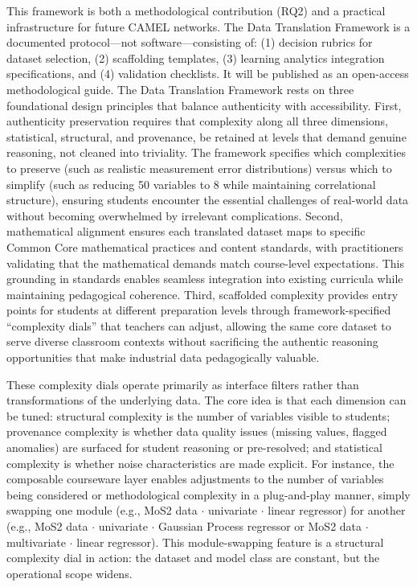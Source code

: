 \documentclass[11pt]{article}
\begin{document}
 This framework is both a methodological contribution (RQ2) and a practical infrastructure for future CAMEL networks.
The Data Translation Framework is a documented protocol—not software—consisting of: (1) decision rubrics for dataset selection, (2) scaffolding templates, (3) learning analytics integration specifications, and (4) validation checklists. It will be published as an open-access methodological guide.
The Data Translation Framework rests on three foundational design principles that balance authenticity with accessibility. 
First, authenticity preservation requires that complexity along all three dimensions, statistical, structural, and provenance, be retained at levels that demand genuine reasoning, not cleaned into triviality. The framework specifies which complexities to preserve (such as realistic measurement error distributions) versus which to simplify (such as reducing 50 variables to 8 while maintaining correlational structure), ensuring students encounter the essential challenges of real-world data without becoming overwhelmed by irrelevant complications. 
Second, mathematical alignment ensures each translated dataset maps to specific Common Core mathematical practices and content standards, with practitioners validating that the mathematical demands match course-level expectations. 
This grounding in standards enables seamless integration into existing curricula while maintaining pedagogical coherence. 
Third, scaffolded complexity provides entry points for students at different preparation levels through framework-specified ``complexity dials'' that teachers can adjust, allowing the same core dataset to serve diverse classroom contexts without sacrificing the authentic reasoning opportunities that make industrial data pedagogically valuable.

These complexity dials operate primarily as interface filters rather than transformations of the underlying data. 
The core idea is that each dimension can be tuned: structural complexity is the number of variables visible to students; provenance complexity is whether data quality issues (missing values, flagged anomalies) are surfaced for student reasoning or pre-resolved; and statistical complexity is whether noise characteristics are made explicit. 
For instance, the composable courseware layer enables adjustments to the number of variables being considered or methodological complexity in a plug-and-play manner, simply swapping one module (e.g., MoS2 data $\cdot$ univariate $\cdot$ linear regressor) for another (e.g., MoS2 data $\cdot$ univariate $\cdot$ Gaussian Process regressor or MoS2 data $\cdot$ multivariate $\cdot$ linear regressor).
This module-swapping feature is a structural complexity dial in action: the dataset and model class are constant, but the operational scope widens.
\end{document}
